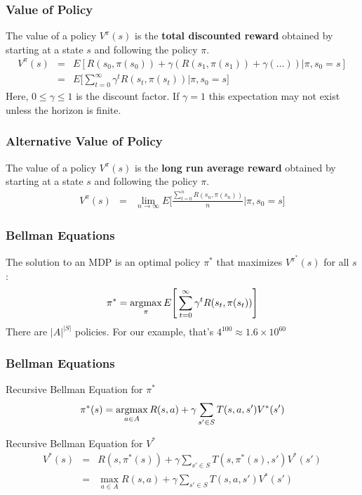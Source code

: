 \documentclass[ignorenonframetext]{beamer}
\newcommand{\argmax}{\operatornamewithlimits{argmax}}
\begin{document}
\begin{frame}
	\frametitle{Value of Policy}
		The value of a policy $V^\pi(s)$ is the \textbf{total discounted
		reward} obtained by starting at a state $s$ and following the
		policy $\pi$.
		\begin{eqnarray*}	
			V^\pi(s) &=& E[R(s_0,\pi(s_0)) + \gamma (R(s_1,\pi(s_1)) + \gamma( \dots
			)) | \pi, s_0 = s]\\
			&=& E \Bigg[\sum_{t=0}^\infty \gamma^t R(s_t,\pi(s_t)) \Big| \pi, s_0 =
			s  \Bigg]
		\end{eqnarray*}	
		Here, $0 \leq \gamma \leq 1$ is the discount factor. If $\gamma =
		1$ this expectation may not exist unless the horizon is finite.
\end{frame}

\begin{frame}
	\frametitle{Alternative Value of Policy}
		The value of a policy $V^\pi(s)$ is the \textbf{long run average
		reward} obtained by starting at a state $s$ and following the
		policy $\pi$.
		\begin{eqnarray*}	
			V^\pi(s) &=& \lim_{n \to \infty} E\Bigg[\frac{\sum_{t=0}^n
			R(s_n,\pi(s_n))}{n}\Big| \pi, s_0 = s\Bigg]
		\end{eqnarray*}	
\end{frame}

\begin{frame}
	\frametitle{Bellman Equations}
	The solution to an MDP is an optimal policy $\pi^*$ that maximizes
	$V^{\pi^*}(s)$ for all $s$:
	\[
	\pi^* = \argmax_{\pi} E\Bigg[\sum_{t=0}^\infty \gamma^t
	R(s_t,\pi(s_t))\Bigg] 
	\]
	There are $|A|^{|S|}$ policies.  For our example, that's $4^{100}
	\approx 1.6\times 10^{60}$
\end{frame}

\begin{frame}
	\frametitle{Bellman Equations}
	\begin{block}{Recursive Bellman Equation for $\pi^*$}
		\[
		\pi^*(s) = \argmax_{a\in A} R(s,a) + \gamma \sum_{s'\in S} T(s,a,s')V^*(s')
		\]
	\end{block}
	\begin{block}{Recursive Bellman Equation for $V^*$ \footnotemark}
		\begin{eqnarray*}
			V^*(s) &=& R(s,\pi^*(s)) + \gamma \sum_{s' \in S}T(s,\pi^*(s),
			s') V^*(s')\\
			&=& \max_{a \in A} R(s,a) + \gamma \sum_{s' \in S}T(s,a, s') V^*(s')
		\end{eqnarray*}
	\end{block}
\end{frame}
\end{document}

